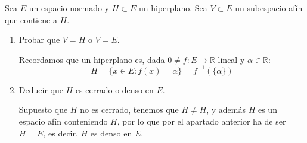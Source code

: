 \begin{ejercicio} %
    Sea $E$ un espacio normado y $H\subset E$ un hiperplano. Sea $V\subset E$ un subespacio afín que contiene a $H$.
    \begin{enumerate}[label=\alph*)]
        \item Probar que $V=H$ o $V=E$.

            Recordamos que un hiperplano es, dada $0\neq f:E\to \mathbb{R}$ lineal y $\alpha\in \mathbb{R}$:
            \begin{equation*}
                H = \{x\in E : f(x)=\alpha\} = f^{-1}(\{\alpha\})
            \end{equation*}



        \item Deducir que $H$ es cerrado o denso en $E$.

            Supuesto que $H$ no es cerrado, tenemos que $\overline{H}\neq H$, y además $\overline{H}$ es un espacio afín conteniendo $H$, por lo que por el apartado anterior ha de ser $\overline{H}=E$, es decir, $H$ es denso en $E$.
    \end{enumerate}
\end{ejercicio}


